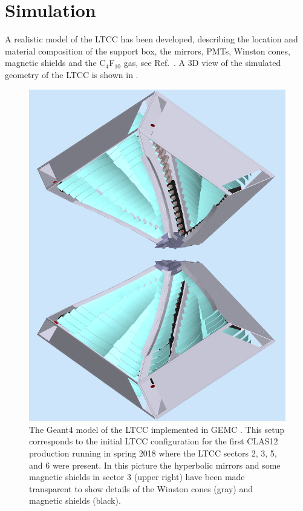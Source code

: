 \section{Simulation}

A realistic model of the LTCC has been developed, describing the location and material composition
of the support box, the mirrors, PMTs, Winston cones, magnetic shields and the C$_4$F$_{10}$ gas, see
Ref.~\cite{sim-nim}. A 3D view of the simulated geometry of the LTCC is shown in .

\begin{figure}
	\centering
	\includegraphics[width=0.99\columnwidth,keepaspectratio]{img/simOverview.png}
	\caption{The Geant4 model of the LTCC implemented in GEMC \cite{sim-nim}. This setup corresponds to the
          initial LTCC configuration for the first CLAS12 production running in spring 2018 where the LTCC sectors
          2, 3, 5, and 6 were present. In this picture the hyperbolic mirrors and some magnetic shields in sector 3
          (upper right) have been made transparent to show details of the Winston cones (gray) and magnetic shields
          (black).}
	\label{fig:simOverview}
\end{figure}

